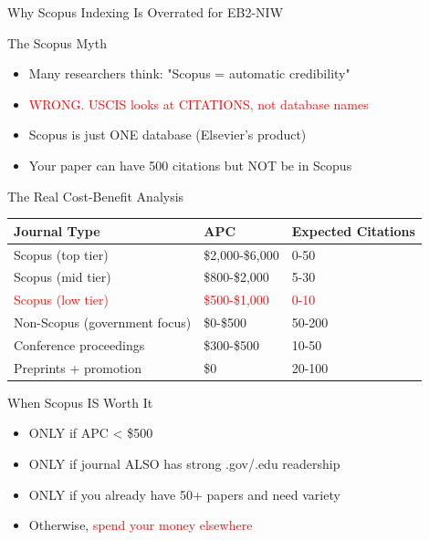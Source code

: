 \documentclass[11pt]{beamer}
\begin{document}
	
	\begin{frame}{Why Scopus Indexing Is Overrated for EB2-NIW}
		\scriptsize
		\begin{block}{The Scopus Myth}
			\begin{itemize}
				\item Many researchers think: "Scopus = automatic credibility"
				\item \textcolor{red}{WRONG. USCIS looks at CITATIONS, not database names}
				\item Scopus is just ONE database (Elsevier's product)
				\item Your paper can have 500 citations but NOT be in Scopus
			\end{itemize}
		\end{block}
		
		\begin{block}{The Real Cost-Benefit Analysis}
			\centering
			\begin{tabular}{|p{4cm}|p{3cm}|p{3cm}|}
				\hline
				\textbf{Journal Type} & \textbf{APC} & \textbf{Expected Citations} \\
				\hline
				Scopus (top tier) & \$2,000-\$6,000 & 0-50 \\
				\hline
				Scopus (mid tier) & \$800-\$2,000 & 5-30 \\
				\hline
				\textcolor{red}{Scopus (low tier)} & \textcolor{red}{\$500-\$1,000} & \textcolor{red}{0-10} \\
				\hline
				Non-Scopus (government focus) & \$0-\$500 & 50-200 \\
				\hline
				Conference proceedings & \$300-\$500 & 10-50 \\
				\hline
				Preprints + promotion & \$0 & 20-100 \\
				\hline
			\end{tabular}
		\end{block}
		
		\begin{block}{When Scopus IS Worth It}
			\begin{itemize}
				\item ONLY if APC < \$500
				\item ONLY if journal ALSO has strong .gov/.edu readership
				\item ONLY if you already have 50+ papers and need variety
				\item Otherwise, \textcolor{red}{spend your money elsewhere}
			\end{itemize}
		\end{block}
	\end{frame}
	
\end{document}
